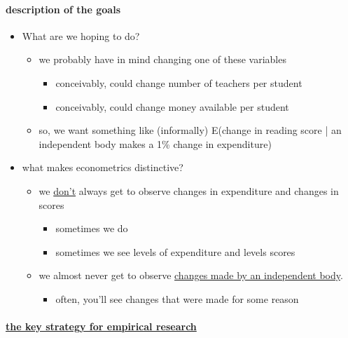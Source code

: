 \paragraph{description of the goals}
\label{sec-1-1-1}

\begin{itemize}
\item What are we hoping to do?
\begin{itemize}
\item we probably have in mind changing one of these variables
\begin{itemize}
\item conceivably, could change number of teachers per student
\item conceivably, could change money available per student
\end{itemize}
\item so, we want something like (informally) E(change in reading
          score | an independent body makes a 1\% change in expenditure)
\end{itemize}
\item what makes econometrics distinctive?
\begin{itemize}
\item we \underline{don't} always get to observe changes in expenditure and
          changes in scores
\begin{itemize}
\item sometimes we do
\item sometimes we see levels of expenditure and levels scores
\end{itemize}
\item we almost never get to observe \underline{changes made by an independent           body}.
\begin{itemize}
\item often, you'll see changes that were made for some reason
\end{itemize}
\end{itemize}
\end{itemize}
\paragraph{\underline{the key strategy for empirical research}}
\label{sec-1-1-2}

